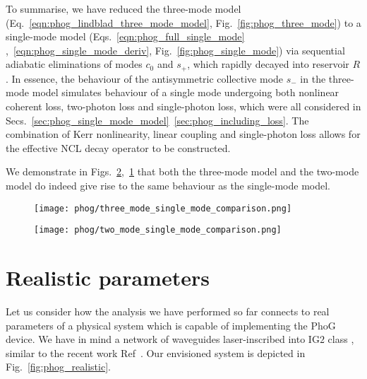 To summarise, we have reduced the three-mode model (Eq.~\ref{eqn:phog_lindblad_three_mode_model}, Fig.~\ref{fig:phog_three_mode}) to a single-mode model (Eqs.~\ref{eqn:phog_full_single_mode}
,~\ref{eqn:phog_single_mode_deriv}, Fig.~\ref{fig:phog_single_mode}) via sequential adiabatic eliminations of modes $c_0$ and $s_+$, which rapidly decayed into reservoir $R$. In essence, the behaviour of the antisymmetric collective mode $s_-$ in the three-mode model simulates behaviour of a single mode undergoing both nonlinear coherent loss, two-photon loss and single-photon loss, which were all considered in Secs.~\ref{sec:phog_single_mode_model}~\ref{sec:phog_including_loss}. The combination of Kerr nonlinearity, linear coupling and single-photon loss allows for the effective NCL decay operator to be constructed.

We demonstrate in Figs.~\ref{fig:phog_two_mode_single_mode_comparison},~\ref{fig:phog_three_mode_single_mode_comparison} that both the three-mode model and the two-mode model do indeed give rise to the same behaviour as the single-mode model. 

\begin{figure}[htp]
\centering
\texttt{[image: phog/three\_mode\_single\_mode\_comparison.png]}
\caption{\label{fig:phog_three_mode_single_mode_comparison} }
\end{figure}

\begin{figure}[htp]
\centering
\texttt{[image: phog/two\_mode\_single\_mode\_comparison.png]}
\caption{\label{fig:phog_two_mode_single_mode_comparison} }
\end{figure}

\clearpage
\section{Realistic parameters}\label{sec:parameters}

Let us consider how the analysis we have performed so far connects to real parameters of a physical system which is capable of implementing the PhoG device. We have in mind a network of waveguides laser-inscribed into IG$2$ class , similar to the recent work Ref~\cite{Mukherjee2017}. Our envisioned system is depicted in Fig.~\ref{fig:phog_realistic}.

